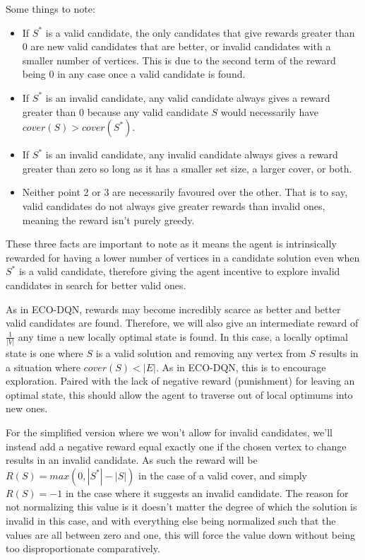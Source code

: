 \documentclass{article}
\begin{document}
Some things to note:

\begin{itemize}
    \item If $S^*$ is a valid candidate, the only candidates that give rewards greater than 0 are new valid candidates that are better, or invalid candidates with a smaller number of vertices. This is due to the second term of the reward being 0 in any case once a valid candidate is found.
    \item If $S^*$ is an invalid candidate, any valid candidate always gives a reward greater than 0 because any valid candidate $S$ would necessarily have $cover(S) > cover(S^*)$. 
    \item If $S^*$ is an invalid candidate, any invalid candidate always gives a reward greater than zero so long as it has a smaller set size, a larger cover, or both.
    \item Neither point 2 or 3 are necessarily favoured over the other. That is to say, valid candidates do not always give greater rewards than invalid ones, meaning the reward isn't purely greedy.
\end{itemize}

These three facts are important to note as it means the agent is intrinsically rewarded for having a lower number of vertices in a candidate solution even when $S^*$ is a valid candidate, therefore giving the agent incentive to explore invalid candidates in search for better valid ones.

As in ECO-DQN, rewards may become incredibly scarce as better and better valid candidates are found. Therefore, we will also give an intermediate reward of $\frac{1}{|V|}$ any time a new locally optimal state is found. In this case, a locally optimal state is one where $S$ is a valid solution and removing any vertex from $S$ results in a situation where $cover(S) < |E|$. As in ECO-DQN, this is to encourage exploration. Paired with the lack of negative reward (punishment) for leaving an optimal state, this should allow the agent to traverse out of local optimums into new ones.

For the simplified version where we won't allow for invalid candidates, we'll instead add a negative reward equal exactly one if the chosen vertex to change results in an invalid candidate. As such the reward will be $R(S) = max(0, |S^*| - |S|)$ in the case of a valid cover, and simply $R(S) = -1$ in the case where it suggests an invalid candidate. The reason for not normalizing this value is it doesn't matter the degree of which the solution is invalid in this case, and with everything else being normalized such that the values are all between zero and one, this will force the value down without being too disproportionate comparatively. 
\end{document}
